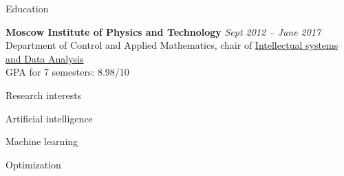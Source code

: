 \documentclass{resume} %
\begin{document}

\begin{rSection}{Education}

{\bf Moscow Institute of Physics and Technology} \hfill {\em Sept 2012 -- June 2017} \\ 
Department of Control and Applied Mathematics, chair of \href{http://www.machinelearning.ru/}{Intellectual systems and Data Analysis}\\
GPA for 7 semesters: 8.98/10

\end{rSection}


\begin{rSection}{Research interests}
	\item Artificial intelligence
	\item Machine learning
	\item Optimization

\end{rSection}
\end{document}
